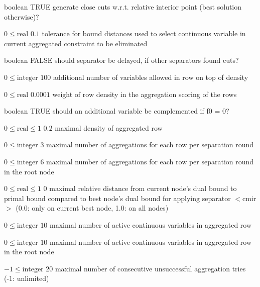 %
{boolean}%
{TRUE}%
{generate close cuts w.r.t. relative interior point (best solution otherwise)?}%
{}

%
{$0\leq\textrm{real}$}%
{$0.1$}%
{tolerance for bound distances used to select continuous variable in current aggregated constraint to be eliminated}%
{}

%
{boolean}%
{FALSE}%
{should separator be delayed, if other separators found cuts?}%
{}

%
{$0\leq\textrm{integer}$}%
{$100$}%
{additional number of variables allowed in row on top of density}%
{}

%
{$0\leq\textrm{real}$}%
{$0.0001$}%
{weight of row density in the aggregation scoring of the rows}%
{}

%
{boolean}%
{TRUE}%
{should an additional variable be complemented if f0 = 0?}%
{}

%
{$0\leq\textrm{real}\leq1$}%
{$0.2$}%
{maximal density of aggregated row}%
{}

%
{$0\leq\textrm{integer}$}%
{$3$}%
{maximal number of aggregations for each row per separation round}%
{}

%
{$0\leq\textrm{integer}$}%
{$6$}%
{maximal number of aggregations for each row per separation round in the root node}%
{}

%
{$0\leq\textrm{real}\leq1$}%
{$0$}%
{maximal relative distance from current node's dual bound to primal bound compared to best node's dual bound for applying separator $<$cmir$>$ (0.0: only on current best node, 1.0: on all nodes)}%
{}

%
{$0\leq\textrm{integer}$}%
{$10$}%
{maximal number of active continuous variables in aggregated row}%
{}

%
{$0\leq\textrm{integer}$}%
{$10$}%
{maximal number of active continuous variables in aggregated row in the root node}%
{}

%
{$-1\leq\textrm{integer}$}%
{$20$}%
{maximal number of consecutive unsuccessful aggregation tries (-1: unlimited)}%
{}

